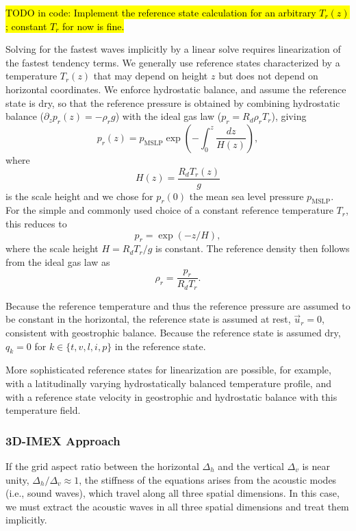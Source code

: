 \documentclass{article}
\begin{document}
\hl{TODO in code: Implement the reference state calculation for an arbitrary $T_r(z)$; constant $T_r$ for now is fine.}

Solving for the fastest waves implicitly by a linear solve requires linearization of the fastest tendency terms. We generally use reference states characterized by a temperature $T_r(z)$ that may depend on height $z$ but does not depend on horizontal coordinates. We enforce hydrostatic balance, and assume the reference state is dry, so that the reference pressure is obtained by combining hydrostatic balance ($\partial_z p_r(z) = - \rho_r g$) with the ideal gas law ($p_r=R_d \rho_r T_r$), giving 
\[
p_r(z) = p_{\mathrm{MSLP}} \exp\left(-\int_0^z \frac{dz}{H(z)} \right),
\]
where
\[
H(z)  = \frac{R_d T_r(z)}{g}
\]
is the scale height and we chose for $p_r(0)$ the mean sea level pressure $p_{\mathrm{MSLP}}$. For the simple and commonly used choice of a constant reference temperature $T_r$, this reduces to
\begin{equation}
    p_r = \exp (-z/H),
\end{equation}
where the scale height $H = R_d T_{r}/g$ is constant. The reference density then follows from the ideal gas law as
\begin{equation}
    \rho_r = \frac{p_r}{R_d T_{r}}.
\end{equation}

Because the reference temperature and thus the reference pressure are assumed to be constant in the horizontal, the reference state is assumed at rest, $\vec{u}_r = 0$, consistent with geostrophic balance. Because the reference state is assumed dry, $q_k= 0$ for $k \in \{ t, v, l, i, p\}$ in the reference state.

More sophisticated reference states for linearization are possible, for example, with a latitudinally varying hydrostatically balanced temperature profile, and with a reference state velocity in geostrophic and hydrostatic balance with this temperature field. 
 
 \subsubsection{3D-IMEX Approach}
 \label{sec:3D-IMEX/v1}
If the grid aspect ratio between the horizontal $\Delta_h$ and the vertical $\Delta_v$ is near unity, $\Delta_h/\Delta_v \approx 1$, the stiffness of the equations arises from the acoustic modes (i.e., sound waves), which travel along all three spatial dimensions. In this case, we must extract the acoustic waves in all three spatial dimensions and treat them implicitly.  
\end{document}
